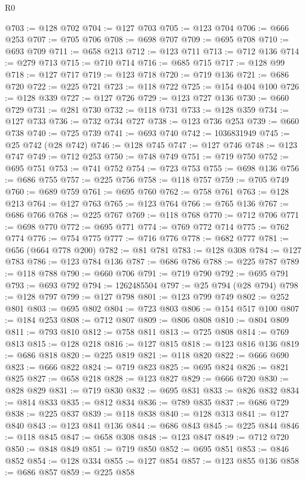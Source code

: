 \begin{lexlean}{R0}
\begin{coremodule}
@703 := @128 @702
@704 := @127 @703
@705 := @123 @704
@706 := @666 @253
@707 := @705 @706
@708 := @698 @707
@709 := @695 @708
@710 := @693 @709
@711 := @658 @213
@712 := @123 @711
@713 := @712 @136
@714 := @279 @713
@715 := @710 @714
@716 := @685 @715
@717 := @128 @99
@718 := @127 @717
@719 := @123 @718
@720 := @719 @136
@721 := @686 @720
@722 := @225 @721
@723 := @118 @722
@725 := @154 @404 @100
@726 := @128 @339
@727 := @127 @726
@729 := @123 @727 @136
@730 := @660 @729
@731 := @281 @730
@732 := @118 @731
@733 := @128 @359
@734 := @127 @733
@736 := @732 @734 @727
@738 := @123 @736 @253
@739 := @660 @738
@740 := @725 @739
@741 := @693 @740
@742 := 1036831949
@745 := @25 @742 (@28 @742)
@746 := @128 @745
@747 := @127 @746
@748 := @123 @747
@749 := @712 @253
@750 := @748 @749
@751 := @719 @750
@752 := @695 @751
@753 := @741 @752
@754 := @723 @753
@755 := @698 @136
@756 := @686 @755
@757 := @225 @756
@758 := @118 @757
@759 := @705 @749
@760 := @689 @759
@761 := @695 @760
@762 := @758 @761
@763 := @128 @213
@764 := @127 @763
@765 := @123 @764
@766 := @765 @136
@767 := @686 @766
@768 := @225 @767
@769 := @118 @768
@770 := @712 @706
@771 := @698 @770
@772 := @695 @771
@774 := @769 @772 @714
@775 := @762 @774
@776 := @754 @775
@777 := @716 @776
@778 := @682 @777
@781 := @656 (@664 @778 @200)
@782 := @81 @781
@783 := @128 @308
@784 := @127 @783
@786 := @123 @784 @136
@787 := @686 @786
@788 := @225 @787
@789 := @118 @788
@790 := @660 @706
@791 := @719 @790
@792 := @695 @791
@793 := @693 @792
@794 := 1262485504
@797 := @25 @794 (@28 @794)
@798 := @128 @797
@799 := @127 @798
@801 := @123 @799 @749
@802 := @252 @801
@803 := @695 @802
@804 := @723 @803
@806 := @154 @517 @100
@807 := @184 @253
@808 := @712 @807
@809 := @806 @808
@810 := @804 @809
@811 := @793 @810
@812 := @758 @811
@813 := @725 @808
@814 := @769 @813
@815 := @128 @218
@816 := @127 @815
@818 := @123 @816 @136
@819 := @686 @818
@820 := @225 @819
@821 := @118 @820
@822 := @666 @690
@823 := @666 @822
@824 := @719 @823
@825 := @695 @824
@826 := @821 @825
@827 := @658 @218
@828 := @123 @827
@829 := @666 @720
@830 := @828 @829
@831 := @719 @830
@832 := @695 @831
@833 := @826 @832
@834 := @814 @833
@835 := @812 @834
@836 := @789 @835
@837 := @686 @729
@838 := @225 @837
@839 := @118 @838
@840 := @128 @313
@841 := @127 @840
@843 := @123 @841 @136
@844 := @686 @843
@845 := @225 @844
@846 := @118 @845
@847 := @658 @308
@848 := @123 @847
@849 := @712 @720
@850 := @848 @849
@851 := @719 @850
@852 := @695 @851
@853 := @846 @852
@854 := @128 @334
@855 := @127 @854
@857 := @123 @855 @136
@858 := @686 @857
@859 := @225 @858

\end{coremodule}
\end{lexlean}

